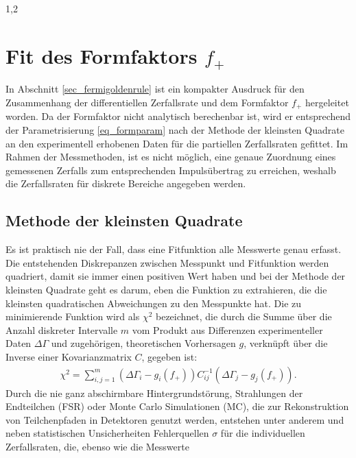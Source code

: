 \documentclass[11pt,a4paper,twoside]{report}
\begin{document}
\begin{spacing}{1,2}
\section{Fit des Formfaktors $f_+$}
In Abschnitt \ref{sec_fermigoldenrule} ist ein kompakter Ausdruck für den Zusammenhang der differentiellen Zerfallsrate und dem 
Formfaktor $f_+$ hergeleitet worden. Da der Formfaktor nicht analytisch berechenbar ist, wird er entsprechend der Parametrisierung \eqref{eq_formparam}
nach der Methode der kleinsten Quadrate an den experimentell erhobenen Daten für die partiellen Zerfallsraten gefittet. Im Rahmen der Messmethoden, ist es
nicht möglich, eine genaue Zuordnung eines gemessenen Zerfalls zum entsprechenden Impulsübertrag zu erreichen, weshalb die Zerfallsraten für diskrete Bereiche
angegeben werden. 

\subsection{Methode der kleinsten Quadrate}
Es ist praktisch nie der Fall, dass eine Fitfunktion alle Messwerte genau erfasst. Die entstehenden Diskrepanzen zwischen Messpunkt und Fitfunktion werden
quadriert, damit sie immer einen positiven Wert haben und bei der Methode der kleinsten Quadrate geht es darum, eben die Funktion zu extrahieren, die die 
kleinsten quadratischen Abweichungen zu den Messpunkte hat. Die zu minimierende Funktion wird als $\chi^2$ bezeichnet, die durch die Summe über die Anzahl diskreter 
Intervalle $m$ vom Produkt aus Differenzen experimenteller Daten $\Delta \Gamma$ und zugehörigen, theoretischen Vorhersagen $g$, verknüpft über die 
Inverse einer Kovarianzmatrix $C$, gegeben ist:
\begin{align}
 \chi^2 = \sum\limits_{i,j=1}^m (\Delta \Gamma_i - g_i(f_+))C^{-1}_{ij}(\Delta \Gamma_j - g_j(f_+)).
 \label{eq_chi2}
\end{align}
Durch die nie ganz abschirmbare Hintergrundstörung, Strahlungen der Endteilchen (FSR) oder Monte Carlo Simulationen (MC), die zur Rekonstruktion von 
Teilchenpfaden in Detektoren genutzt werden, entstehen unter anderem und neben statistischen Unsicherheiten Fehlerquellen $\sigma$ für die individuellen Zerfallsraten, die, ebenso wie die Messwerte 

\end{spacing}
\end{document}
